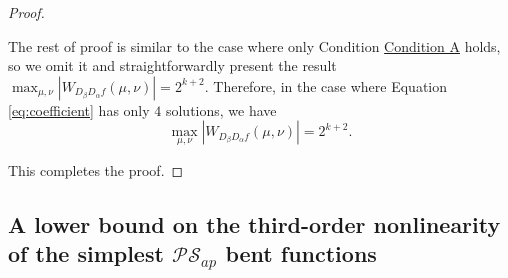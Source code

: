 \documentclass[preprint,10pt]{elsarticle}
\newcommand{\0}{\textbf{0}}
\newcommand{\1}{\textbf{1}}
\theoremstyle{plain}
\begin{document}
\begin{proof}
\begin{enumerate}[label=\textbf{Case \arabic*},wide = 0pt]
            The rest of proof  is similar to the case where only Condition \hyperref[item_a]{\textsf{Condition A}} holds, so we omit it and
            straightforwardly present the result $\max_{\mu,\nu}|W_{D_{\beta}D_{\alpha}f}(\mu,\nu)|=2^{k+2}$.
            Therefore, in the case where Equation \eqref{eq:coefficient} has only $4$ solutions, we have
            \[\max_{\mu,\nu}|W_{D_{\beta}D_{\alpha}f}(\mu,\nu)|=2^{k+2}.\]
        \end{enumerate}
        This completes the proof.
    \end{proof}

\subsection{A lower bound on the third-order nonlinearity of the simplest $\mathcal{PS}_{ap}$ bent functions}
\end{document}
